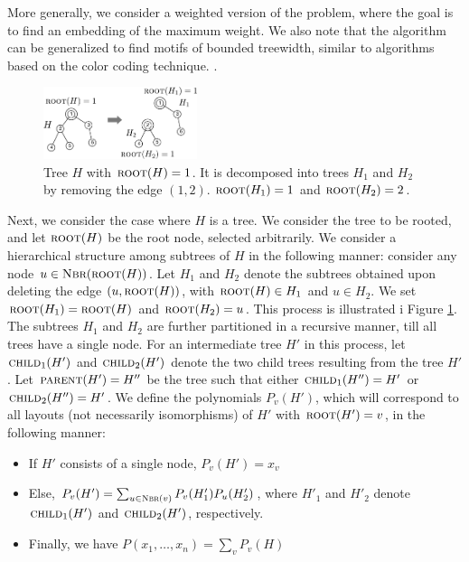 More generally, we consider a weighted version of the problem, where the goal is to find an embedding of the maximum weight. We also note that the algorithm can be generalized to find motifs of bounded treewidth, similar to algorithms based on the color coding technique. \cite{alon1995color}.

\iffalse
{}

\begin{figure}[h]
\includegraphics[width=0.4\textwidth]{img/trees.pdf}
\caption{
\small
Tree $H$ with $\textsc{root}(H)=1$. It is decomposed into trees $H_1$ and $H_2$ by
removing the edge $(1, 2)$. $\textsc{root}(H_1)=1$ and $\textsc{root}(H_2)=2$.
}
\label{fig:trees}
\end{figure}
Next, we consider the case where $H$ is a tree. We consider the tree to be rooted,
and let $\textsc{root}(H)$ be the root node, selected arbitrarily. We consider a hierarchical
structure among subtrees of $H$ in the following manner: consider any node $u\in\textsc{Nbr}(\textsc{root}(H))$.
Let $H_1$ and $H_2$ denote the subtrees obtained upon deleting the edge $(u, \textsc{root}(H))$,
with $\textsc{root}(H)\in H_1$ and $u\in H_2$. We set $\textsc{root}(H_1)=\textsc{root}(H)$ and $\textsc{root}(H_2)=u$.
This process is illustrated i Figure \ref{fig:trees}.
The subtrees $H_1$ and $H_2$ are further partitioned in a recursive manner, till
all trees have a single node. For an intermediate tree $H'$ in this process,
let $\textsc{child}_1(H')$ and $\textsc{child}_2(H')$ denote the two child trees
resulting from the tree $H'$. Let $\textsc{parent}(H')=H''$ be the tree such that
either $\textsc{child}_1(H'')= H'$ or $\textsc{child}_2(H'') = H'$.
We define the polynomials $P_v(H')$, which will correspond to all layouts (not necessarily
isomorphisms) of $H'$ with $\textsc{root}(H')=v$, in the following manner:
\begin{itemize}
\item
If $H'$ consists of a single node, $P_v(H') = x_v$
\item
Else, 
$P_v(H') = \sum_{u\in\textsc{Nbr}(v)} P_v(H'_1)P_u(H'_2)$, where
$H'_1$ and $H'_2$ denote $\textsc{child}_1(H')$ and $\textsc{child}_2(H')$, respectively.
\item
Finally, we have
$P(x_1,\ldots, x_n)= \sum_v P_v(H)$
\end{itemize}

